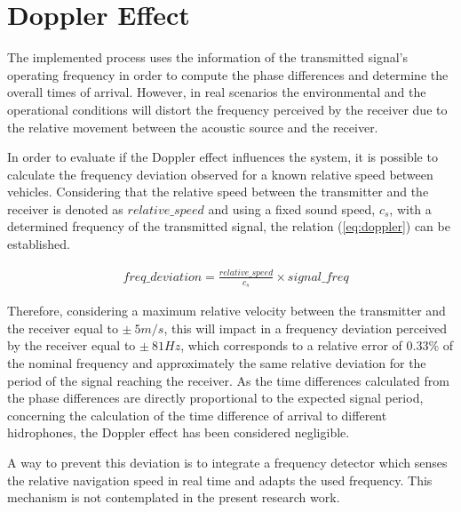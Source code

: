 \section{Doppler Effect}

The implemented process uses the information of the transmitted signal's operating frequency in order to compute the phase differences and determine the overall times of arrival. However, in real scenarios the environmental and the operational conditions will distort the frequency perceived by the receiver due to the relative movement between the acoustic source and the receiver.

In order to evaluate if the Doppler effect influences the system, it is possible to calculate the frequency deviation observed for a known relative speed between vehicles. Considering that the relative speed between the transmitter and the receiver is denoted as $relative\_speed$ and using a fixed sound speed, $c_s$, with a determined frequency of the transmitted signal, the relation (\ref{eq:doppler}) \cite{doppler-eq} can be established. 

\begin{eqnarray}
	&freq\_deviation = \frac{relative\_speed}{c_s} \times signal\_freq
	\label{eq:doppler}
\end{eqnarray}

Therefore, considering a maximum relative velocity between the transmitter and the receiver equal to $\pm \ 5 m/s$, this will impact in a frequency deviation perceived by the receiver equal to $\pm \ 81Hz$, which corresponds to a relative error of 0.33\% of the nominal frequency and approximately the same relative deviation for the period of the signal reaching the receiver. As the time differences calculated from the phase differences are directly proportional to the expected signal period, concerning the calculation of the time difference of arrival to different hidrophones, the Doppler effect has been considered negligible.

A way to prevent this deviation is to integrate a frequency detector which senses the relative navigation speed in real time and adapts the used frequency. This mechanism is not contemplated in the present research work.